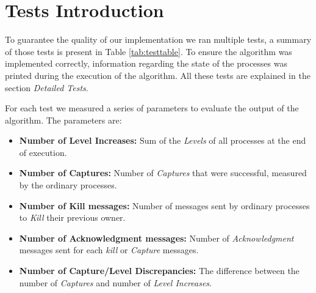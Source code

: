 \section*{Tests Introduction}

	\vspace{10pt}

	\indent To guarantee the quality of our implementation we ran multiple tests, a summary of those tests is present in Table \ref{tab:testtable}. To ensure the algorithm was implemented correctly, information regarding the state of the processes was printed during the execution of the algorithm. All these tests are explained in the section \textit{Detailed Tests}.

	For each test we measured a series of parameters to evaluate the output of the algorithm. The parameters are:

	\begin{itemize}
		\item{\textbf{Number of Level Increases:}} Sum of the \textit{Levels} of all processes at the end of execution. 
		\item{\textbf{Number of Captures:}} Number of \textit{Captures} that were successful, measured by the ordinary processes.
		\item{\textbf{Number of Kill messages:}} Number of messages sent by ordinary processes to \textit{Kill} their previous owner.
		\item{\textbf{Number of Acknowledgment messages:}} Number of \textit{Acknowledgment} messages sent for each \textit{kill} or \textit{Capture} messages.
		\item{\textbf{Number of Capture/Level Discrepancies:}} The difference between the number of \textit{Captures} and number of \textit{Level Increases}.

	\end{itemize}

